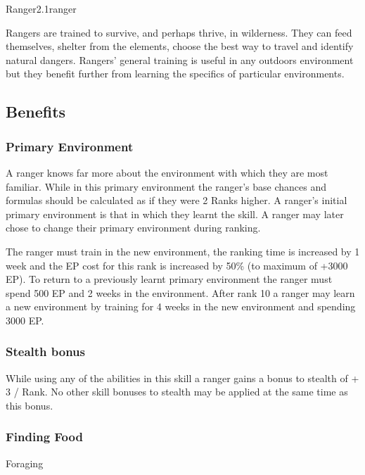 \begin{skill}{Ranger}{2.1}{ranger}

Rangers are trained to survive, and perhaps thrive, in wilderness.
They can feed themselves, shelter from the elements, choose the best
way to travel and identify natural dangers.  Rangers' general training
is useful in any outdoors environment but they benefit further from
learning the specifics of particular environments.

\subsection{Benefits}

\subsubsection{Primary Environment}

A ranger knows far more about the environment with which they are most
familiar. While in this primary environment the ranger's base
chances and formulas should be calculated as if they were 2 Ranks
higher.  A ranger's initial primary environment is that in which
they learnt the skill. A ranger may later chose to change their
primary environment during ranking.

The ranger must train in the new environment, the ranking time is
increased by 1 week and the EP cost for this rank is increased by 50\%
(to maximum of +3000 EP). To return to a previously learnt primary
environment the ranger must spend 500 EP and 2 weeks in the
environment.  After rank 10 a ranger may learn a new environment by
training for 4 weeks in the new environment and spending 3000 EP.

\subsubsection{Stealth bonus}

While using any of the abilities in this skill a ranger gains a bonus
to stealth of + 3 / Rank.  No other skill bonuses to stealth may be
applied at the same time as this bonus.

\subsubsection{Finding Food}

\begin{Description}
\item[Foraging]


\end{Description}
\end{skill}
